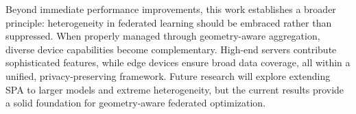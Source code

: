 \documentclass[conference]{IEEEtran}
\begin{document}
Beyond immediate performance improvements, this work establishes a broader principle: heterogeneity in federated learning should be embraced rather than suppressed. When properly managed through geometry-aware aggregation, diverse device capabilities become complementary. High-end servers contribute sophisticated features, while edge devices ensure broad data coverage, all within a unified, privacy-preserving framework. Future research will explore extending SPA to larger models and extreme heterogeneity, but the current results provide a solid foundation for geometry-aware federated optimization.

\balance


\end{document}
